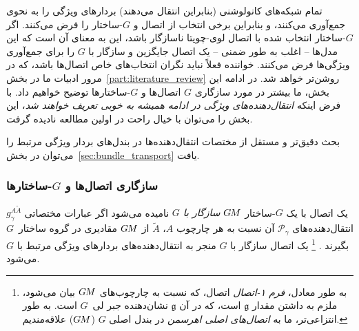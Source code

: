 تمام شبکه‌های کانولوشنی (بنابراین انتقال می‌دهند) بردارهای ویژگی را به نحوی جمع‌آوری می‌کنند، و بنابراین برخی انتخاب از اتصال و $G$-ساختار را فرض می‌کنند.
اگر $G$-ساختار انتخاب شده با اتصال لوی-چویتا ناسازگار باشد، این به معنای آن است که این مدل‌ها -- اغلب به طور ضمنی -- یک اتصال جایگزین و سازگار با $G$ را برای جمع‌آوری ویژگی‌ها فرض می‌کنند.
خواننده فعلاً نباید نگران انتخاب‌های خاص اتصال‌ها باشد، که در مرور ادبیات ما در بخش~\ref{part:literature_review} روشن‌تر خواهد شد.
در ادامه این بخش، ما بیشتر در مورد سازگاری $G$ اتصال‌ها و $G$-ساختارها توضیح خواهیم داد.
با فرض اینکه \emph{انتقال‌دهنده‌های ویژگی در ادامه همیشه به خوبی تعریف خواهند شد}، این بخش را می‌توان با خیال راحت در اولین مطالعه نادیده گرفت.

بحث دقیق‌تر و مستقل از مختصات انتقال‌دهنده‌ها در بندل‌های بردار ویژگی مرتبط را می‌توان در بخش~\ref{sec:bundle_transport} یافت.


\subsubsection{سازگاری اتصال‌ها و \textit{$G$}-ساختارها}

یک اتصال با یک $G$-ساختار $G\mkern-1.4muM$ \emph{سازگار با $G$} نامیده می‌شود اگر عبارات مختصاتی $g_\gamma^{A\widetilde{A}}$ انتقال‌دهنده‌های $\mathcal{P}_\gamma$ آن نسبت به هر چارچوب $A$، $\widetilde{A}$ از $G\mkern-1.4muM$ مقادیری در گروه ساختار~$G$ بگیرند \cite{wendlLectureNotesBundles2008}.%
\footnote{
	به طور معادل، \emph{فرم ۱-اتصال} اتصال، که نسبت به چارچوب‌های $G\mkern-1.4muM$ بیان می‌شود، ملزم به داشتن مقدار $\mathfrak{g}$ است، که در آن $\mathfrak{g}$ نشان‌دهنده جبر لی~$G$ است.
	به طور انتزاعی‌تر، ما به \emph{اتصال‌های اصلی اهرسمن} در بندل اصلی $G$ ($G\mkern-1.4muM$) علاقه‌مندیم.
}
یک اتصال سازگار با $G$ منجر به انتقال‌دهنده‌های بردارهای ویژگی مرتبط با $G$ می‌شود.

